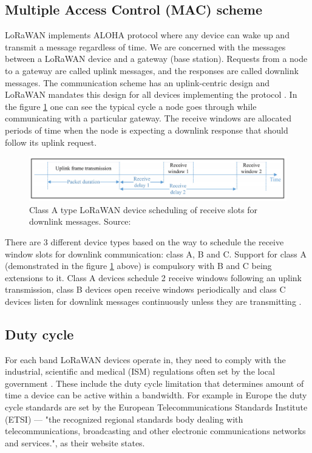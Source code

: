 \newpage

\subsection{Multiple Access Control (MAC) scheme}

LoRaWAN implements ALOHA protocol where any device can wake up and transmit a message regardless of time. We are concerned with the messages between a LoRaWAN device and a gateway (base station). Requests from a node to a gateway are called uplink messages, and the responses are called downlink messages.  
The communication scheme has an uplink-centric design and 
LoRaWAN mandates this design for all devices implementing the protocol \cite{simulator}. In the figure \ref{fig:class A} one can see the typical cycle a node goes through while communicating with a particular gateway. The receive windows are allocated periods of time when the node is expecting 
a downlink response that should follow its uplink request.

\begin{figure}[h!]
  \centering
  \includegraphics[scale=0.5]{figures/class A.PNG}
  \caption{Class A type LoRaWAN device scheduling of receive slots for downlink messages. Source: \cite{doppler}}
  \label{fig:class A}
\end{figure}

There are 3 different device types based on the way to schedule the receive window slots for downlink communication: class A, B and C. Support for class A (demonstrated in the figure \ref{fig:class A} above) is compulsory with B and C being extensions to it. Class A devices schedule 2 receive windows following an uplink transmission, class B devices open receive windows periodically and class C devices listen for downlink messages continuously unless they are transmitting \cite{lora_alliance_spec}. 

\subsection{Duty cycle}
For each band LoRaWAN devices operate in, they need to comply with the industrial, scientific and medical (ISM) regulations often set by the local government \cite{duty_cycle}. These include the duty cycle limitation that determines amount of time a device can be active within a bandwidth. For example in Europe the duty cycle standards are set by the 
European Telecommunications Standards Institute (ETSI) —  "the recognized regional standards body dealing with telecommunications, broadcasting and other electronic communications networks and services.", as their website  \cite{about_etsi} states.\\ 

